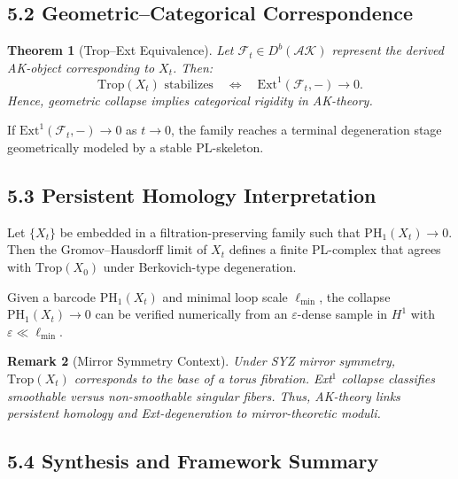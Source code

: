 \documentclass[11pt]{article}
\newtheorem{theorem}{Theorem}[section]
\newtheorem{remark}[theorem]{Remark}
\begin{document}
\subsection{5.2 Geometric–Categorical Correspondence}

\begin{theorem}[Trop--Ext Equivalence]
Let $\mathcal{F}_t \in D^b(\mathcal{AK})$ represent the derived AK-object corresponding to $X_t$. Then:
\[
\mathrm{Trop}(X_t) \text{ stabilizes} \quad \Longleftrightarrow \quad \mathrm{Ext}^1(\mathcal{F}_t, -) \to 0.
\]
Hence, geometric collapse implies categorical rigidity in AK-theory.
\end{theorem}

\begin{corollary}
If $\mathrm{Ext}^1(\mathcal{F}_t, -) \to 0$ as $t \to 0$, the family reaches a terminal degeneration stage geometrically modeled by a stable PL-skeleton.
\end{corollary}

\subsection{5.3 Persistent Homology Interpretation}

\begin{lemma}
Let $\{X_t\}$ be embedded in a filtration-preserving family such that $\mathrm{PH}_1(X_t) \to 0$. Then the Gromov--Hausdorff limit of $X_t$ defines a finite PL-complex that agrees with $\mathrm{Trop}(X_0)$ under Berkovich-type degeneration.
\end{lemma}

\begin{proposition}
Given a barcode $\mathrm{PH}_1(X_t)$ and minimal loop scale $\ell_{\min}$, the collapse $\mathrm{PH}_1(X_t) \to 0$ can be verified numerically from an $\varepsilon$-dense sample in $H^1$ with $\varepsilon \ll \ell_{\min}$.
\end{proposition}

\begin{remark}[Mirror Symmetry Context]
Under SYZ mirror symmetry, $\mathrm{Trop}(X_t)$ corresponds to the base of a torus fibration. Ext$^1$ collapse classifies smoothable versus non-smoothable singular fibers. Thus, AK-theory links persistent homology and Ext-degeneration to mirror-theoretic moduli.
\end{remark}

\subsection{5.4 Synthesis and Framework Summary}
\end{document}
